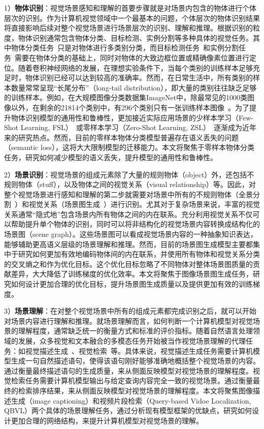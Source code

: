 1）\textbf{物体识别}：视觉场景感知和理解的首要步骤就是对场景内包含的物体进行个体层次的识别。作为计算机视觉领域中一个最基本的问题，个体层次的物体识别结果将直接影响后续对整个视觉场景进行场景层次的识别、理解和推理。根据识别的粒度，物体识别通常包含物体分类、目标检测、实例分割等多种具体的视觉任务。其中物体分类任务~\cite{russakovsky2015imagenet,krizhevsky2012imagenet,simonyan2015very,szegedy2015going,he2016deep,xie2017aggregated,hu2018squeeze}只是对物体进行多类别分类，而目标检测任务~\cite{ren2015faster,liu2016ssd,redmon2016you}和实例分割任务~\cite{he2017mask}需要在物体分类的基础上，同时对物体的大致边框位置或精确像素位置进行定位。随着卷积神经网络的发展，在理想实验条件下，当每个类别的训练样本足够充足时，物体识别已经可以达到较高的准确率。然而，在日常生活中，所有类别的样本数量常常呈现“长尾分布”（long-tail distribution），即大量的类别往往缺乏足够的训练样本。例如，在大规模图像分类数据集ImageNet中，除最常见的1000类图像以外，在剩余的21814个类别中，有296个类别只有一张训练样本图像~\cite{russakovsky2015imagenet}。为了提升物体识别模型的通用性和鲁棒性，更加接近实际应用场景的少样本学习（Few-Shot Learning, FSL）~\cite{fei2006one}或零样本学习（Zero-Shot Learning, ZSL）~\cite{lampert2009learning}逐渐成为近年来的研究热点。然而，目前的零样本物体分类模型普遍存在语义丢失的问题（semantic loss），这将大大限制模型的迁移能力。本文将聚焦于零样本物体分类任务，研究如何减少模型的语义丢失，提升模型的通用性和鲁棒性。

2）\textbf{场景识别}：视觉场景的组成元素除了大量的规则物体（object）外，还包括不规则物体（stuff），以及物体之间的视觉关系（visual relationship）等。因此，对整个视觉场景进行感知和理解的第二步就需要对场景中所有的不规则物体（全景分割~\cite{kirillov2019panoptic}）和视觉关系（场景图生成~\cite{johnson2015image}）进行识别。尤其对于复杂场景来说，丰富的视觉关系通常“隐式地”包含场景内所有物体之间的内在联系。充分利用视觉关系不仅可以帮助提升单个物体的识别，同时可以将非结构化的视觉场景内容转换成结构化的场景图（scene graph）。这些场景图可以看成视觉场景内容的一种抽象知识表达，能够辅助更高语义层级的场景理解和推理。然而，目前的场景图生成模型主要都集中于研究如何更加有效地编码物体间的内在联系，并使用所有物体和视觉关系分类的交叉熵之和作为优化目标。这个优化目标忽略了不同物体对整体场景图质量的贡献差异，大大降低了训练梯度的优化效率。本文将聚焦于图像场景图生成任务，研究如何设计更加合理的优化目标，提升场景图生成质量以及提供更加有效的训练梯度。

3）\textbf{场景理解}：在对整个视觉场景中所有的组成元素都完成识别之后，就可以开始对场景内容进行理解和推理。就场景理解而言，如何判断一个计算机模型对视觉场景的理解程度，通常缺乏统一的衡量方式和标准的评价指标。随着自然语言处理领域的发展，众多视觉和文本融合的多模态任务开始被当作视觉场景理解的代理任务：如视觉描述生成~\cite{vinyals2015show}、视觉检索~\cite{gao2017tall}等。具体来说，视觉描述生成任务需要计算机模型生成一句自然描述语句，使得该语句刚好能够准确地概括整个视觉场景的内容。通过衡量最终描述语句的生成质量，来从侧面反映模型对视觉场景的理解程度。视觉检索任务需要计算机模型输出与给定查询内容完全一致的视觉场景。通过衡量最终的检索排序结果，来从侧面反映模型对视觉场景的理解程度。本文将聚焦图像描述生成（image captioning）和视频片段检索（Query-based Vidoe Localization, QBVL）两个具体的场景理解任务，通过分析现有模型框架的优缺点，研究如何设计更加合理的网络结构，来提升计算机模型对视觉场景的理解。


